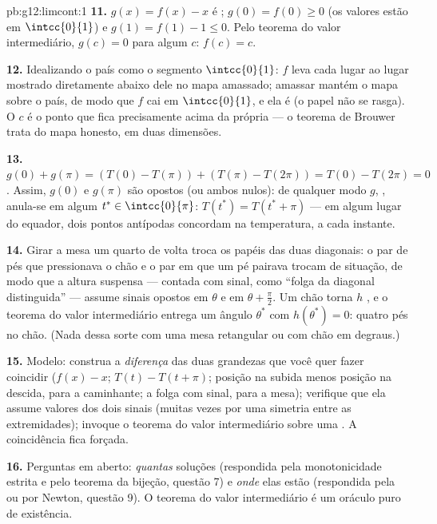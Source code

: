 \begin{solution}{pb:g12:limcont:1}
\textbf{11.} $g(x) = f(x) - x$ é ;
$g(0) = f(0) \geq 0$ (os valores estão em $\intcc{0}{1}$) e
$g(1) = f(1) - 1 \leq 0$. Pelo teorema do valor intermediário,
$g(c) = 0$ para algum $c$: $f(c) = c$.

\textbf{12.} Idealizando o país como o segmento
$\intcc{0}{1}$: $f$ leva cada lugar ao lugar mostrado
diretamente abaixo dele no mapa amassado; amassar mantém o mapa
sobre o país, de modo que $f$ cai em $\intcc{0}{1}$, e ela é
 (o papel não se rasga). O  $c$ é o ponto
que fica precisamente acima da própria  --- o teorema de
Brouwer trata do mapa honesto, em duas dimensões.

\textbf{13.} $g(0) + g(\pi) = \left(T(0) - T(\pi)\right) +
\left(T(\pi) - T(2\pi)\right) = T(0) - T(2\pi) = 0$. Assim,
$g(0)$ e $g(\pi)$ são opostos (ou ambos nulos): de qualquer
modo $g$, , anula-se em algum
$t^* \in \intcc{0}{\pi}$: $T(t^*) = T(t^* + \pi)$ --- em algum
lugar do equador, dois pontos antípodas concordam na
temperatura, a cada instante.

\textbf{14.} Girar a mesa um quarto de volta troca os papéis
das duas diagonais: o par de pés que pressionava o chão e o par
em que um pé pairava trocam de situação, de modo que a altura
suspensa --- contada com sinal, como ``folga da diagonal
distinguida'' --- assume sinais opostos em $\theta$ e em
$\theta + \frac\pi2$. Um chão  torna $h$ , e o
teorema do valor intermediário entrega um ângulo $\theta^*$ com
$h(\theta^*) = 0$: quatro pés no chão. (Nada dessa sorte com
uma mesa retangular ou com chão em degraus.)

\textbf{15.} Modelo: construa a \emph{diferença} das duas
grandezas que você quer fazer coincidir ($f(x) - x$;
$T(t) - T(t + \pi)$; posição na subida menos posição na descida,
para a caminhante; a folga com sinal, para a mesa); verifique
que ela assume valores dos dois sinais (muitas vezes por uma
simetria entre as extremidades); invoque o teorema do valor
intermediário sobre uma  . A coincidência fica
forçada.

\textbf{16.} Perguntas em aberto: \emph{quantas} soluções
(respondida pela monotonicidade estrita e pelo teorema da
bijeção, questão 7) e \emph{onde} elas estão (respondida pela
 ou por Newton, questão 9). O teorema do valor
intermediário é um oráculo puro de existência.


\end{solution}
